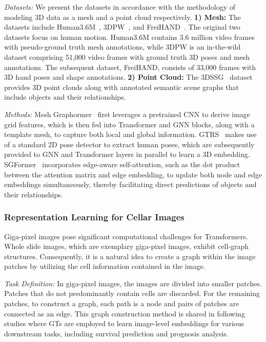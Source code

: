 \textit{Datasets:} We present the datasets in accordance with the methodology of modeling 3D data as a mesh and a point cloud respectively. \textbf{1) Mesh:} The datasets include Human3.6M~\cite{human36m}, 3DPW~\cite{vonMarcard2018}, and FreiHAND~\cite{zimmermann2019freihand}. The original two datasets focus on human motion. Human3.6M contains 3.6 million video frames with pseudo-ground truth mesh annotations, while 3DPW is an in-the-wild dataset comprising 51,000 video frames with ground truth 3D poses and mesh annotations. The subsequent  dataset, FreiHAND, consists of 33,000 frames with 3D hand poses and shape annotations. \textbf{2) Point Cloud:} The 3DSSG~\cite{Wald2020} dataset provides 3D point clouds along with annotated semantic scene graphs that include objects and their relationships.

\textit{Methods:} Mesh Graphormer~\cite{lin2021mesh} first leverages a pretrained CNN to derive image grid features, which is then fed into Transformer and GNN blocks, along with a template mesh, to capture both local and global information.
GTRS~\cite{zheng2022lightweight} makes use of a standard 2D pose detector to extract human poses, which are subsequently provided to GNN and Transformer layers in parallel to learn a 3D embedding. SGFormer~\cite{lv2024sgformer} incorporates edge-aware self-attention, such as the dot product between the attention matrix and edge embedding, to update both node and edge embeddings simultaneously, thereby facilitating direct predictions of objects and their relationships.
\subsubsection{\textbf{Representation Learning for Cellar Images}}

Giga-pixel images pose significant computational challenges for Transformers. Whole slide images, which are exemplary giga-pixel images, exhibit cell-graph structures. Consequently, it is a natural idea to create a graph within the image patches by utilizing the cell information contained in the image.


\textit{Task Definition:} In giga-pixel images, the images are divided into smaller patches. Patches that do not predominantly contain cells are discarded. 
For the remaining patches, to construct a graph, each path is a node and pairs of patches are connected as an edge.
This graph construction method is shared in following studies where GTs are employed to learn image-level embeddings for various downstream tasks, including survival prediction and prognosis analysis.

